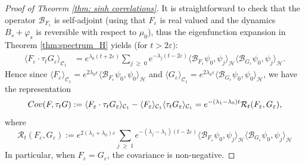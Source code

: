 \documentclass[10pt,a4paper]{amsart}
\newcommand{\cjd}{\rangle}
\newcommand{\cjg}{\langle}
\def\eps{\varepsilon}
\renewcommand{\geq}{\;\geqslant\;}                   %
\newcommand{\la}{\lambda}
\newcommand{\mc}{\mathcal}
\begin{document}
\begin{proof}[Proof of Theorem \ref{thm: sinh correlations}]
It is straightforward to check that the operator $\mc{B}_{F_\eps}$ is self-adjoint (using that $F_\eps$ is real valued and the 
dynamics $B_s+\varphi_s$ is reversible with respect to $\mu_0$), thus the eigenfunction expansion in Theorem \ref{thm:spectrum_H} yields (for $t>2\eps)$: 
\[\begin{split}
\langle F_\eps \cdot \tau_{t} G_\eps \rangle_{\mathcal C_1} &= e^{\lambda_0(t+2\eps)} \sum_{j \geq 0} e^{-\lambda_j (t-2\eps)} \langle  \mc{B}_{F_\eps}\psi_0,\psi_j \rangle_{\mathcal H} \langle \mc{B}_{G_\eps}\psi_0,\psi_j\rangle_{\mathcal H}.
\end{split}\]
Hence since $\langle F_\eps \rangle_{\mathcal C_1}=e^{2\la_0\eps}\cjg \mc{B}_{F_\eps}\psi_0,\psi_0\cjd_{\mc{H}}$ and $\langle G_\eps \rangle_{\mathcal C_1}=e^{2\la_0\eps}\cjg \mc{B}_{G_\eps}\psi_0,\psi_0\cjd_{\mc{H}}$,
we have the representation
\begin{equation} \label{eq: covariances}
{\rm Cov}(F,\tau_t G) := \langle F_\eps \cdot \tau_tG_\eps \rangle_{\mathcal C_1} - \langle F_\eps \rangle_{\mathcal C_1} \langle \tau_t G_\eps \rangle_{\mathcal C_1} = e^{-(\lambda_1-\lambda_0)t} \mathcal R_t(F_\eps, G_\eps),
\end{equation}
where
\begin{equation}
\mathcal R_t(F_\eps, G_\eps):= e^{2(\lambda_1+\lambda_0)\eps} \sum_{j \geq 1} e^{-(\lambda_j - \lambda_1)(t-2\eps)} \langle  \mc{B}_{F_\eps}\psi_0,\psi_j \rangle_{\mathcal H} \langle \mc{B}_{G_\eps}\psi_0,\psi_j\rangle_{\mathcal H} 
\end{equation}
In particular, when $F_\eps = G_\eps$, the covariance is non-negative. 



\end{proof}
\end{document}
